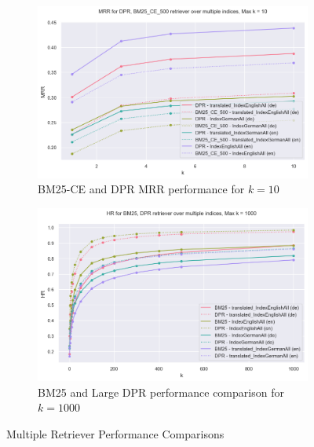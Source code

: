 \begin{figure}
\begin{subfigure}{.5\textwidth}
        \includegraphics[width=\linewidth]{Grafiken/Evaluation/Data_Generation/best_retriever.png}
        \captionsetup{width=.9\linewidth}
        \caption{BM25-CE and DPR MRR performance for $k = 10$}
        \label{fig:retriever-performance-best-retriever}
    \end{subfigure}%
    \begin{subfigure}{.5\textwidth}
        \centering
        \includegraphics[width=\linewidth]{Grafiken/Evaluation/Data_Generation/BM25_DPR_1000.png}
        \captionsetup{width=.9\linewidth}
        \caption{BM25 and Large DPR performance comparison for $k = 1000$}
        \label{fig:retriever-performance-bm25-vs-dpr}
    \end{subfigure}
    \caption{Multiple Retriever Performance Comparisons}
    \label{fig:retriever-performance}
\end{figure}


